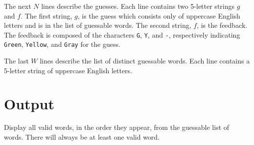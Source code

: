 The next $N$ lines describe the guesses. Each line contains two 5-letter strings $g$ and $f$. 
The first string, $g$, is the guess which consists only of uppercase English letters and is
in the list of guessable words. The second string, $f$, is the feedback.
The feedback is composed of the characters \texttt{G}, \texttt{Y},
and \texttt{-}, respectively indicating \texttt{Green}, \texttt{Yellow}, and \texttt{Gray} for the
guess.

The last $W$ lines describe the list of distinct guessable words. Each line contains a 5-letter string of
uppercase English letters.

\section*{Output}
Display all valid words, in the order they appear, from the guessable list of words. There will always
be at least one valid word.
